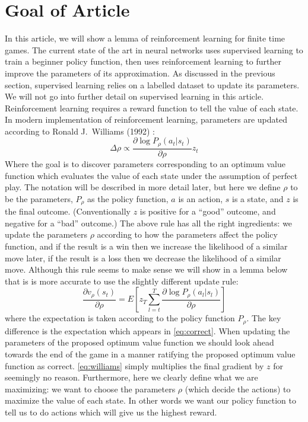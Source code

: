 \documentclass[11pt]{article}
\begin{document}
\section{Goal of Article}
In this article, we will show a lemma of reinforcement learning for finite time games.
The current state of the art in neural networks uses supervised learning to train a beginner
policy function, then uses reinforcement learning to further improve the parameters of its approximation.
As discussed in the previous section, supervised learning relies on a labelled dataset to
update its parameters. We will not go into further detail on supervised learning in this article.
Reinforcement learning requires a reward function to tell the value of each state. In modern implementation
of reinforcement learning, parameters are updated according to Ronald J.\ Williams (1992) \cite{williams1992}:
\begin{equation}\label{eq:williams}
\Delta \rho \propto \frac{\partial \log P_\rho(a_t|s_t)}{\partial \rho} z_t
\tag{1}
\end{equation}
Where the goal is to discover parameters corresponding to an optimum value function which
evaluates the value of each state under the assumption of perfect play. The notation will be
described in more detail later, but here we define $\rho$ to be the parameters, $P_\rho$ as the policy
function, $a$ is an action, $s$ is a state, and $z$ is the final outcome. (Conventionally $z$ is positive for
a ``good'' outcome, and negative for a ``bad'' outcome.)
The above rule has all the right ingredients: we update the parameters $\rho$ according to how
the parameters affect the policy function, and if the result is a win then we increase the likelihood
of a similar move later, if the result is a loss then we decrease the likelihood of a similar move.
Although this rule seems to make sense we will show in a lemma below that is is more accurate
to use the slightly different update rule:
\begin{equation}\label{eq:correct}
\frac{\partial v_\rho(s_t)}{\partial \rho}
=
E\!\left[
z_T\sum_{l=t}^T \frac{\partial\log P_\rho(a_l|s_l)}{\partial \rho}
\right]
\tag{2}
\end{equation}
where the expectation is taken according to the policy function $P_\rho$.
The key difference is the expectation which appears in \eqref{eq:correct}. When updating the parameters
of the proposed optimum value function we should look ahead towards the end of the game in a
manner ratifying the proposed optimum value function as correct. \eqref{eq:williams} simply multiplies the final
gradient by $z$ for seemingly no reason.
Furthermore, here we clearly define what we are maximizing: we want to choose the parameters
$\rho$ (which decide the actions) to maximize the value of each state. In other words we want
our policy function to tell us to do actions which will give us the highest reward.
\end{document}
